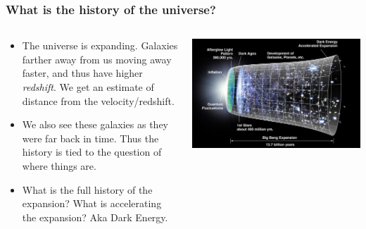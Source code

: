 \documentclass{beamer}
\begin{document}
\frame
{

    \frametitle{What is the history of the universe?}


    \begin{columns}
        \begin{column}{0.5\textwidth}
            \begin{itemize}


                \item The universe is expanding.  Galaxies farther away from
                    us moving away faster, and thus have higher {\em redshift}.
                    We get an estimate of distance from the velocity/redshift.
                    
                \item We also see these galaxies as they were far back in time.
                    Thus the history is tied to the question of where things
                    are.

                \item What is the full history of the expansion?  What is
                    accelerating the expansion? Aka Dark Energy.


            \end{itemize}
        \end{column}
        \begin{column}{0.5\textwidth}
            \begin{center}
                \includegraphics[width=\textwidth]{CMB_Timeline300_no_WMAP.jpg}
            \end{center}
            
        \end{column}
    \end{columns}


}
\end{document}
